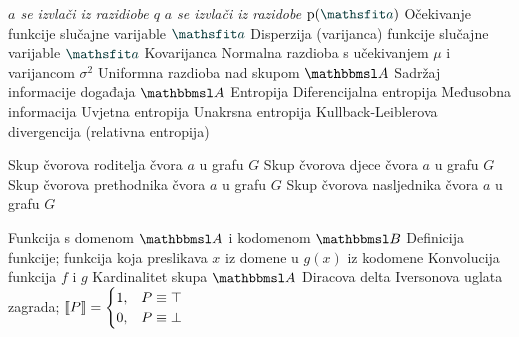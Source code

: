  {\textit{$a$ se izvlači iz razidiobe $q$}}
 {\textit{$a$ se izvlači iz razidobe $\p(\rvar a)$}}
 {Očekivanje funkcije slučajne varijable $\rvar a$}
 {Disperzija (varijanca) funkcije slučajne varijable $\rvar a$}
		{Kovarijanca}
 {Normalna razdioba s učekivanjem $\mu$ i varijancom $\sigma^2$}
 {Uniformna razdioba nad skupom $\set A$}
			{Sadržaj informacije događaja $\set A$}
			{Entropija}
			{Diferencijalna entropija}
	  {Međusobna informacija}
 {Uvjetna entropija}
 {Unakrsna entropija}
 {Kullback-Leiblerova divergencija (relativna entropija)}

	{Skup čvorova roditelja čvora $a$ u grafu $G$}
	{Skup čvorova djece čvora $a$ u grafu $G$}
	{Skup čvorova prethodnika čvora $a$ u grafu $G$}
	{Skup čvorova nasljednika čvora $a$ u grafu $G$}

 {Funkcija s domenom $\set A$ i kodomenom $\set B$}
 {Definicija funkcije; funkcija koja preslikava $x$ iz domene u $g(x)$ iz kodomene}
	{Konvolucija funkcija $f$ i $g$}
	{Kardinalitet skupa $\set A$}
	{Diracova delta}
 {Iversonova uglata zagrada; $\enbbracket{P}=\begin{cases} 1, & P \equiv \top \\ 0, & P \equiv \bot \end{cases}$}
